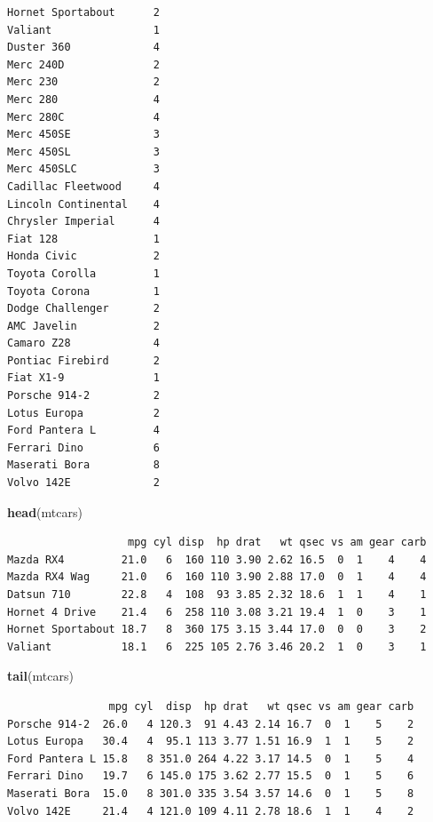\documentclass[]{book}
\newenvironment{Shaded}{\begin{snugshade}}{\end{snugshade}}
\newcommand{\KeywordTok}[1]{\textcolor[rgb]{0.13,0.29,0.53}{\textbf{#1}}}
\newcommand{\NormalTok}[1]{#1}
\theoremstyle{definition}
\theoremstyle{definition}
\theoremstyle{definition}
\theoremstyle{remark}
\begin{document}
\begin{verbatim}
Hornet Sportabout      2
Valiant                1
Duster 360             4
Merc 240D              2
Merc 230               2
Merc 280               4
Merc 280C              4
Merc 450SE             3
Merc 450SL             3
Merc 450SLC            3
Cadillac Fleetwood     4
Lincoln Continental    4
Chrysler Imperial      4
Fiat 128               1
Honda Civic            2
Toyota Corolla         1
Toyota Corona          1
Dodge Challenger       2
AMC Javelin            2
Camaro Z28             4
Pontiac Firebird       2
Fiat X1-9              1
Porsche 914-2          2
Lotus Europa           2
Ford Pantera L         4
Ferrari Dino           6
Maserati Bora          8
Volvo 142E             2
\end{verbatim}

\begin{Shaded}
\begin{Highlighting}[]
\KeywordTok{head}\NormalTok{(mtcars)}
\end{Highlighting}
\end{Shaded}

\begin{verbatim}
                   mpg cyl disp  hp drat   wt qsec vs am gear carb
Mazda RX4         21.0   6  160 110 3.90 2.62 16.5  0  1    4    4
Mazda RX4 Wag     21.0   6  160 110 3.90 2.88 17.0  0  1    4    4
Datsun 710        22.8   4  108  93 3.85 2.32 18.6  1  1    4    1
Hornet 4 Drive    21.4   6  258 110 3.08 3.21 19.4  1  0    3    1
Hornet Sportabout 18.7   8  360 175 3.15 3.44 17.0  0  0    3    2
Valiant           18.1   6  225 105 2.76 3.46 20.2  1  0    3    1
\end{verbatim}

\begin{Shaded}
\begin{Highlighting}[]
\KeywordTok{tail}\NormalTok{(mtcars)}
\end{Highlighting}
\end{Shaded}

\begin{verbatim}
                mpg cyl  disp  hp drat   wt qsec vs am gear carb
Porsche 914-2  26.0   4 120.3  91 4.43 2.14 16.7  0  1    5    2
Lotus Europa   30.4   4  95.1 113 3.77 1.51 16.9  1  1    5    2
Ford Pantera L 15.8   8 351.0 264 4.22 3.17 14.5  0  1    5    4
Ferrari Dino   19.7   6 145.0 175 3.62 2.77 15.5  0  1    5    6
Maserati Bora  15.0   8 301.0 335 3.54 3.57 14.6  0  1    5    8
Volvo 142E     21.4   4 121.0 109 4.11 2.78 18.6  1  1    4    2
\end{verbatim}
\end{document}
